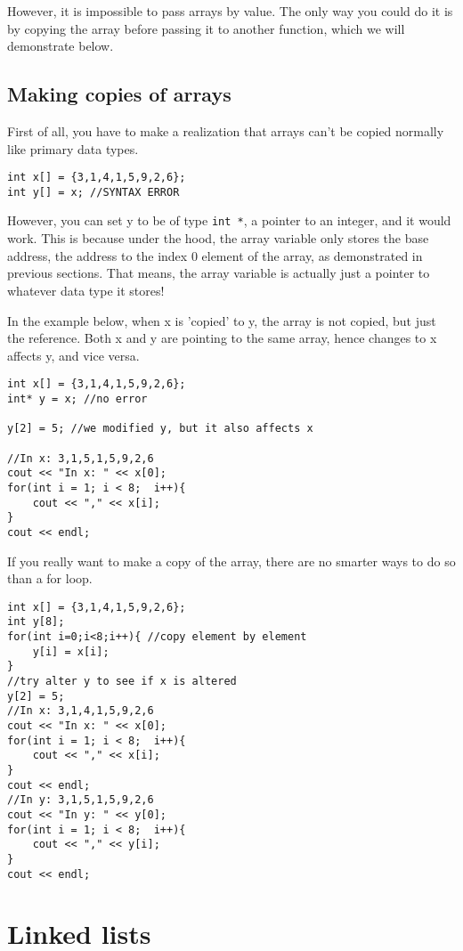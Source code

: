 However, it is impossible to pass arrays by value. The only way you could do it is by copying the array before passing it to another function, which we will demonstrate below.

\subsection{Making copies of arrays}

First of all, you have to make a realization that arrays can't be copied normally like primary data types.

\begin{lstlisting}
int x[] = {3,1,4,1,5,9,2,6};
int y[] = x; //SYNTAX ERROR
\end{lstlisting}

However, you can set y to be of type \texttt{int *}, a pointer to an integer, and it would work. This is because under the hood, the array variable only stores the base address, the address to the index 0 element of the array, as demonstrated in previous sections. That means, the array variable is actually just a pointer to whatever data type it stores! 

In the example below, when x is 'copied' to y, the array is not copied, but just the reference. Both x and y are pointing to the same array, hence changes to x affects y, and vice versa. 

\begin{lstlisting}
int x[] = {3,1,4,1,5,9,2,6};
int* y = x; //no error

y[2] = 5; //we modified y, but it also affects x

//In x: 3,1,5,1,5,9,2,6 
cout << "In x: " << x[0];
for(int i = 1; i < 8;  i++){
    cout << "," << x[i];
}
cout << endl;
\end{lstlisting}

If you really want to make a copy of the array, there are no smarter ways to do so than a for loop.

\begin{lstlisting}
int x[] = {3,1,4,1,5,9,2,6};
int y[8];
for(int i=0;i<8;i++){ //copy element by element
    y[i] = x[i];
}
//try alter y to see if x is altered
y[2] = 5;
//In x: 3,1,4,1,5,9,2,6
cout << "In x: " << x[0];
for(int i = 1; i < 8;  i++){
    cout << "," << x[i];
}
cout << endl;
//In y: 3,1,5,1,5,9,2,6
cout << "In y: " << y[0];
for(int i = 1; i < 8;  i++){
    cout << "," << y[i];
}
cout << endl;
\end{lstlisting}

\section{Linked lists}


